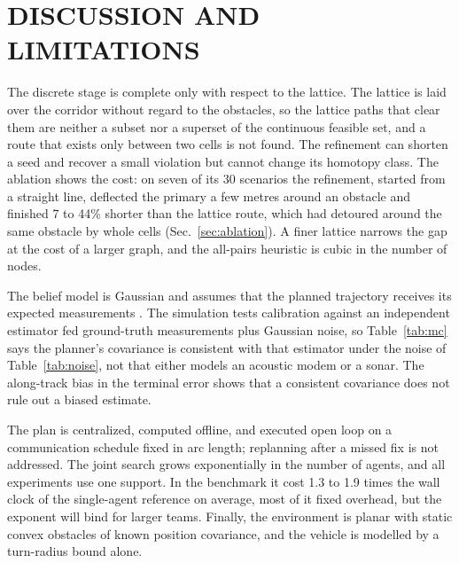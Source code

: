 \documentclass[letterpaper, 10 pt, conference]{ieeeconf}
\theoremstyle{remark}
\begin{document}
\section{DISCUSSION AND LIMITATIONS}
\label{sec:limitations}
The discrete stage is complete only with respect to the lattice. The lattice
is laid over the corridor without regard to the obstacles, so the lattice
paths that clear them are neither a subset nor a superset of the continuous
feasible set, and a route that exists only between two cells is not found.
The refinement can shorten a seed and recover a small violation but cannot
change its homotopy class. The ablation shows the cost: on seven of its 30
scenarios the refinement, started from a straight line, deflected the primary
a few metres around an obstacle and finished 7 to 44\% shorter than the
lattice route, which had detoured around the same obstacle by whole cells
(Sec.~\ref{sec:ablation}). A finer lattice narrows the gap at the cost of a
larger graph, and the all-pairs heuristic is cubic in the number of nodes.

The belief model is Gaussian and assumes that the planned trajectory
receives its expected measurements \cite{platt2010belief}. The simulation
tests calibration against an independent estimator fed ground-truth
measurements plus Gaussian noise, so Table~\ref{tab:mc} says the planner's
covariance is consistent with that estimator under the noise of
Table~\ref{tab:noise}, not that either models an acoustic modem or a sonar. The along-track bias in the terminal error shows that a consistent
covariance does not rule out a biased estimate.

The plan is centralized, computed offline, and executed open loop on a
communication schedule fixed in arc length; replanning after a missed fix is
not addressed. The joint search grows exponentially in the
number of agents, and all experiments use one support. In the benchmark it
cost 1.3 to 1.9 times the wall clock of the single-agent reference on
average, most of it fixed overhead, but the exponent will bind for larger
teams. Finally, the environment is planar with static convex obstacles of
known position covariance, and the vehicle is modelled by a turn-radius
bound alone.

\end{document}
